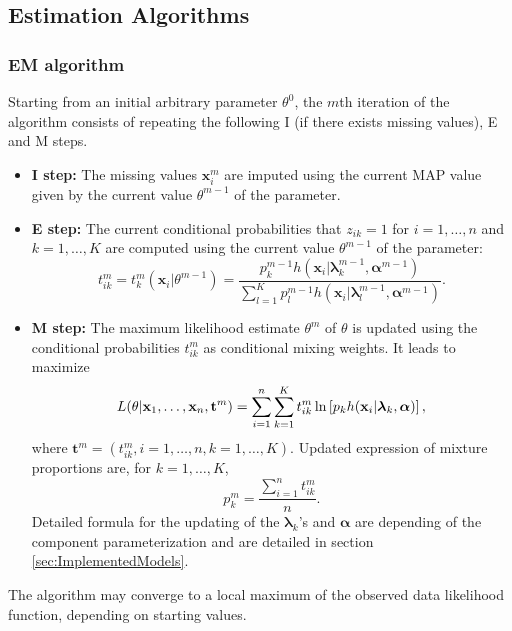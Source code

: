 \documentclass[shortnames,nojss,article]{jss}
\newcommand{\bx}{\mathbf{x}}
\newcommand{\bt}{\mathbf{t}}
\newcommand{\balpha}{\boldsymbol{\alpha}}
\newcommand{\blambda}{\boldsymbol{\lambda}}
\begin{document}
\subsection{Estimation Algorithms}\label{subsec:algorithms}

\subsubsection{EM algorithm}
Starting from an initial arbitrary parameter $\theta^0$, the $m$th iteration of
the  algorithm consists of repeating the following I (if there
exists missing values), E  and M steps.
\begin{itemize}
\item {\bf I step:} The missing values $\bx_i^m$ are imputed using the current
MAP value given by the current value $\theta^{m-1}$ of the parameter.

\item {\bf E step:} The current conditional probabilities that $z_{ik}=1$ for
$i=1,\ldots,n$ and $k=1,\ldots,K$ are computed using the current value
$\theta^{m-1}$ of the parameter:
\begin{equation}\label{eq:condi}
t^m_{ik}=t^m_k(\bx_i|\theta^{m-1})=\frac{ p^{m-1}_k
h(\bx_i|{\blambda^{m-1}_k},\balpha^{m-1})}
{\sum_{l=1}^K  p^{m-1}_l h(\bx_i|\blambda^{m-1}_l,\balpha^{m-1})}.
\end{equation}

\item {\bf M step:} The maximum likelihood estimate $\theta^m$ of $\theta$
is updated using the conditional probabilities $t^m_{ik}$ as conditional
mixing weights. It leads to maximize
\begin{equation} \label{eq:mStepEM}
L(\theta| {\bx}_{1},\ldots,{\bx}_{n}, {\bt}^m)
=\sum_{i=1}^{n}\sum_{k=1}^{K} t_{ik}^m \ln \left [p_{k} h({\bf x}_{i}|\blambda_{k},\balpha)\right],
\end{equation}
where ${\bt}^m=(t_{ik}^m, i=1,\ldots,n, k=1,\ldots,K)$. Updated expression of
mixture proportions are, for $k=1,\ldots,K$,
\begin{equation}
p_k^m=\frac{\sum_{i=1}^n t^m_{ik}}{n}.
\end{equation}
Detailed formula for the updating of the $\blambda_k$'s and $\balpha$ are
depending of the component parameterization and are detailed in
section \ref{sec:ImplementedModels}.
\end{itemize}
The  algorithm may converge to a local maximum of the observed data
likelihood function, depending on starting values.
\end{document}
